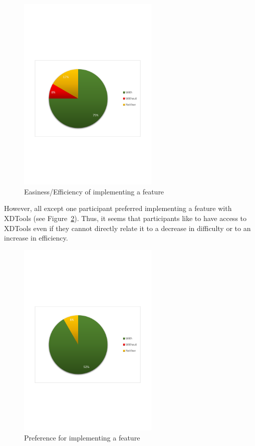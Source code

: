 \begin{figure}[H]
  \centering
    \includegraphics[width=0.6\textwidth]{images/charts/implementing_easier.pdf}
	\caption[Easiness of implementing]{Easiness/Efficiency of implementing a feature}
	\label{fig:implementing_easier}
\end{figure}

However, all except one participant preferred implementing a feature with XDTools (see Figure~\ref{fig:prefer_implementing}). Thus, it seems that participants like to have access to XDTools even if they cannot directly relate it to a decrease in difficulty or to an increase in efficiency.

\begin{figure}[H]
  \centering
    \includegraphics[width=0.6\textwidth]{images/charts/prefer_implementing.pdf}
	\caption[Preference for implementing]{Preference for implementing a feature}
	\label{fig:prefer_implementing}
\end{figure}

